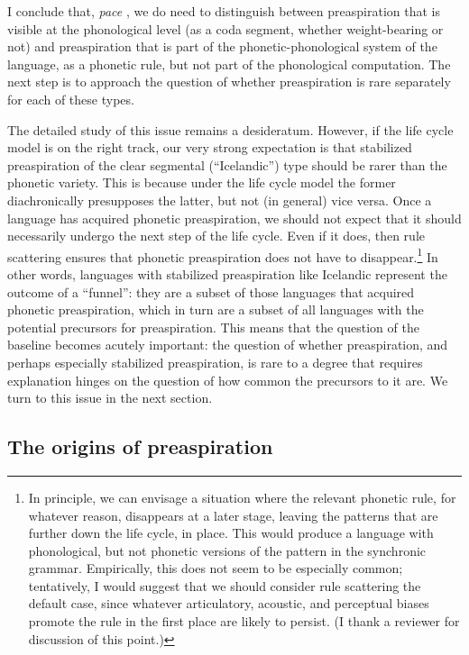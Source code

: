 \documentclass[output=paper,colorlinks,citecolor=brown]{langscibook}
\begin{document}
I conclude that, \emph{pace} , we do need to distinguish between preaspiration that is visible at the phonological level (as a coda \ipa{[h]} segment, whether weight\hyp bearing or not) and preaspiration that is part of the pho\-net\-ic-pho\-nol\-o\-gi\-cal system of the language, as a phonetic rule, but not part of the phonological computation. The next step is to approach the question of whether preaspiration is rare separately for each of these types.

The detailed study of this issue remains a desideratum. However, if the life cycle model is on the right track, our very strong expectation is that stabilized preaspiration of the clear segmental (\enquote{Icelandic}) type should be rarer than the phonetic variety. This is because under the life cycle model the former diachronically presupposes the latter, but not (in general) vice versa. Once a language has acquired phonetic preaspiration, we should not expect that it should necessarily undergo the next step of the life cycle. Even if it does, then  rule scattering ensures that phonetic preaspiration does not have to disappear.\footnote{In principle, we can envisage a situation where the relevant phonetic rule, for whatever reason, disappears at a later stage, leaving the patterns that are further down the life cycle, in place. This would produce a language with phonological, but not phonetic versions of the pattern in the synchronic grammar. Empirically, this does not seem to be especially common; tentatively, I would suggest that we should consider rule scattering the default case, since whatever articulatory, acoustic, and perceptual biases promote the rule in the first place are likely to persist. (I thank a reviewer for discussion of this point.)} In other words, languages with stabilized preaspiration like Icelandic represent the outcome of a \enquote{funnel}: they are a subset of those languages that acquired phonetic preaspiration, which in turn are a subset of all languages with the potential precursors for preaspiration.
This means that the question of the baseline becomes acutely important: the question of whether preaspiration, and perhaps especially stabilized preaspiration, is rare to a degree that requires explanation hinges on the question of how common the precursors to it are. We turn to this issue in the next section.

\subsection{The origins of preaspiration}
\label{sec:orig-preasp}
\end{document}

